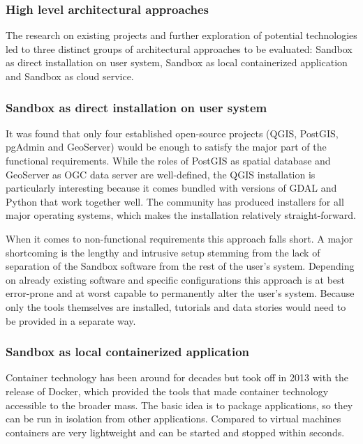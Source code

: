 \documentclass[11pt, a4paper, oneside, parskip=full-]{scrartcl}
\begin{document}
\subsubsection{High level architectural approaches}
The research on existing projects and further exploration of potential
technologies led to three distinct groups of architectural approaches to be
evaluated: Sandbox as direct installation on user system, Sandbox as local
containerized application and Sandbox as cloud service.

\subsubsection*{Sandbox as direct installation on user system}
It was found that only four established open-source projects (QGIS\cite{qgis},
PostGIS\cite{postgis}, pgAdmin\cite{pgadmin} and GeoServer\cite{geoserver})
would be enough to satisfy the major part of the functional requirements. While
the roles of PostGIS as spatial database and GeoServer as OGC data server are
well-defined, the QGIS installation is particularly interesting because it comes
bundled with versions of GDAL and Python that work together well. The community
has produced installers for all major operating systems, which makes the
installation relatively straight-forward.

When it comes to non-functional requirements this approach falls short. A major
shortcoming is the lengthy and intrusive setup stemming from the lack of
separation of the Sandbox software from the rest of the user's system. Depending
on already existing software and specific configurations this approach is at
best error-prone and at worst capable to permanently alter the user's system.
Because only the tools themselves are installed, tutorials and data stories
would need to be provided in a separate way.

\subsubsection*{Sandbox as local containerized application}
Container technology has been around for decades but took off in 2013 with the
release of Docker, which provided the tools that made container technology
accessible to the broader mass. The basic idea is to package applications, so
they can be run in isolation from other applications. Compared to virtual
machines containers are very lightweight and can be started and stopped within
seconds.
\end{document}
